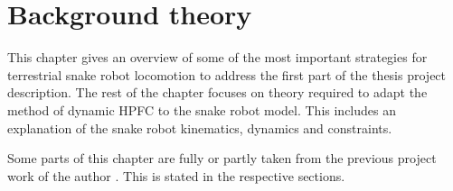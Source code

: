 \chapter{Background theory}\label{chapter:theory}

This chapter gives an overview of some of the most important strategies for terrestrial snake robot locomotion to address the first part of the thesis project description. The rest of the chapter focuses on theory required to adapt the method of dynamic HPFC to the snake robot model. This includes an explanation of the snake robot kinematics, dynamics and constraints.


Some parts of this chapter are fully or partly taken from the previous project work of the author \cite{AtussaProsjektoppgp}. This is stated in the respective sections.








%







